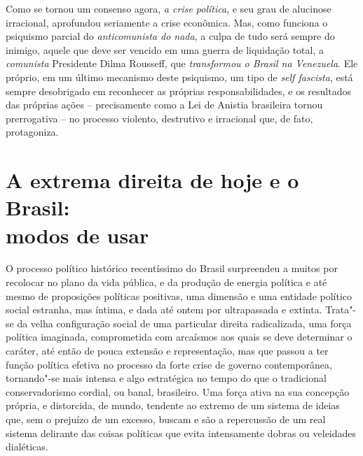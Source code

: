 Como se tornou um consenso agora, \emph{a crise política}, e seu grau de
alucinose irracional, aprofundou seriamente a crise econômica. Mas, como
funciona o psiquismo parcial do \emph{anticomunista do nada}, a culpa de
tudo será sempre do inimigo, aquele que deve ser vencido em uma guerra
de liquidação total, a \emph{comunista} Presidente Dilma Rousseff, que
\emph{transformou o Brasil na Venezuela}. Ele próprio, em um último
mecanismo deste psiquismo, um tipo de \emph{self fascista}, está sempre
desobrigado em reconhecer as próprias responsabilidades, e os resultados
das próprias ações -- precisamente como a Lei de Anistia brasileira
tornou prerrogativa -- no processo violento, destrutivo e irracional
que, de fato, protagoniza.

\chapter{A extrema direita de hoje e o Brasil:\\ modos de usar}

O processo político histórico recentíssimo do Brasil surpreendeu a
muitos por recolocar no plano da vida pública, e da produção de energia
política e até mesmo de proposições políticas positivas, uma dimensão e
uma entidade político social estranha, mas íntima, e dada até ontem por
ultrapassada e extinta. Trata"-se da velha configuração social de uma
particular direita radicalizada, uma força política imaginada,
comprometida com arcaísmos aos quais se deve determinar o caráter, até
então de pouca extensão e representação, mas que passou a ter função
política efetiva no processo da forte crise de governo contemporânea,
tornando"-se mais intensa e algo estratégica no tempo do que o
tradicional conservadorismo cordial, ou banal, brasileiro. Uma força
ativa na sua concepção própria, e distorcida, de mundo, tendente ao
extremo de um sistema de ideias que, sem o prejuízo de um excesso,
buscam e são a repercussão de um real sistema delirante das coisas
políticas que evita intensamente dobras ou veleidades dialéticas.

